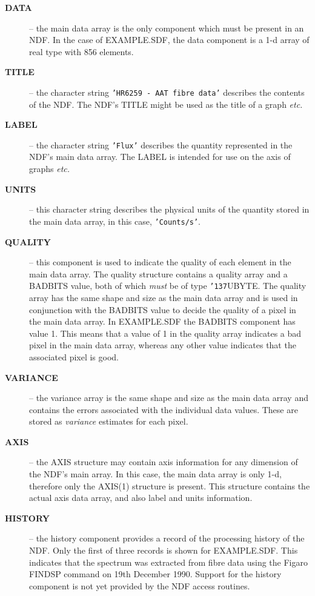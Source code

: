 \documentclass[twoside,11pt]{article}
\renewcommand{\_}{{\tt\char'137}}
\begin{document}
\begin{description}

\item[{\bf DATA}] -- the main data array is the only
component which must be present in an NDF.
In the case of EXAMPLE.SDF, the data component is a 1-d
array of real type with 856 elements.

\item[{\bf TITLE}] -- the  character string {\tt'HR6259 - AAT fibre
data'} describes the contents of the NDF. The NDF's TITLE
might be used as the title of a graph {\it etc.}

\item[{\bf LABEL}] -- the character string {\tt'Flux'} describes the
quantity represented in the NDF's main data array. The LABEL is
intended for use on the axis of graphs {\it etc.}

\item[{\bf UNITS}] -- this character string
describes the physical units of the quantity stored in the main data
array, in this case, {\tt'Counts/s'}.

\item[{\bf QUALITY}] -- this component is used to indicate
the quality of each element in the main data array.
The quality structure contains a
quality array and a BADBITS value, both of which {\sl must\/} be of
type \_UBYTE.
The quality array has the same shape and size as
the main data array and is used in conjunction with the BADBITS value
to decide the quality of a pixel in the main data array.
In EXAMPLE.SDF the BADBITS component has value 1.
This means that a value of 1 in the quality array indicates a bad pixel
in the main data array, whereas any other value indicates that
the associated pixel is good.

\item[{\bf VARIANCE}] -- the variance array is the same shape and size
as the main data array and contains the errors
associated with the individual data values.
These are stored as {\sl variance\/} estimates for each
pixel.

\item[{\bf AXIS}] -- the AXIS structure may contain axis information
for any dimension of the NDF's main array.
In this case, the main data array is only 1-d, therefore only the
AXIS(1) structure is present.
This structure contains the actual axis data array, and also
label and units information.

\item[{\bf HISTORY}] -- the history component provides a record of
the processing history of the NDF.
Only the first of three records is shown for EXAMPLE.SDF. This indicates
that the spectrum was extracted from fibre data using the Figaro FINDSP
command on 19th December 1990.
Support for the history component is not yet provided by the NDF access
routines.



\end{description}
\end{document}
